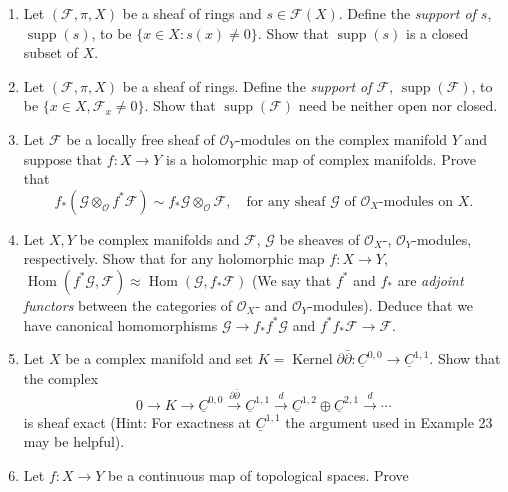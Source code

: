 \begin{enumerate}
\begin{enumerate}[label=\Alph*)]
\item $\widetilde{\mathcal F}_x=0$, $x\notin Z$, $=\mathcal F_x$, $x\in Z$.
\item $i^{-1}\widetilde{\mathcal F}\approx\mathcal F$.
\end{enumerate}
\item Let $(\mathcal F,\pi,X)$ be a sheaf of rings and $s\in\mathcal F(X)$. Define the \emph{support of $s$}, $\operatorname{supp}(s)$, to be $\{x\in X:s(x)\neq0\}$. Show that $\operatorname{supp}(s)$ is a closed subset of $X$.
\item Let $(\mathcal F,\pi,X)$ be a sheaf of rings. Define the \emph{support of $\mathcal F$}, $\operatorname{supp}(\mathcal F)$, to be $\{x\in X,\mathcal F_x\neq0\}$. Show that $\operatorname{supp}(\mathcal F)$ need be neither open nor closed.
\item Let $\mathcal F$ be a locally free sheaf of $\mathcal O_Y$-modules on the complex manifold $Y$ and suppose that $f:X\to Y$ is a holomorphic map of complex manifolds. Prove that
\[
f_*(\mathcal G\otimes_{\mathcal O}f^*\mathcal F)\sim f_*\mathcal G\otimes_{\mathcal O}\mathcal F,\quad\text{for any sheaf $\mathcal G$ of $\mathcal O_X$-modules on $X$.}
\]
\item Let $X,Y$ be complex manifolds and $\mathcal F$, $\mathcal G$ be sheaves of $\mathcal O_X$-, $\mathcal O_Y$-modules, respectively. Show that for any holomorphic map $f:X\to Y$, $\operatorname{Hom}(f^*\mathcal G,\mathcal F)\approx\operatorname{Hom}(\mathcal G,f_*\mathcal F)$ (We say that $f^*$ and $f_*$ are \emph{adjoint functors} between the categories of $\mathcal O_X$- and $\mathcal O_Y$-modules). Deduce that we have canonical homomorphisms $\mathcal G\to f_*f^*\mathcal G$ and $f^*f_*\mathcal F\to\mathcal F$.
\item Let $X$ be a complex manifold and set $K=\operatorname{Kernel}\partial\bar\partial:\underline C^{0,0}\to\underline C^{1,1}$. Show that the complex
\[
0\to K\to\underline C^{0,0}\xrightarrow{\partial\bar\partial}\underline C^{1,1}\xrightarrow d\underline C^{1,2}\oplus\underline C^{2,1}\xrightarrow d\cdots
\]
is sheaf exact (Hint: For exactness at $\underline C^{1,1}$ the argument used in Example 23 may be helpful).
\item Let $f:X\to Y$ be a continuous map of topological spaces. Prove
\begin{enumerate}[label=\alph*)]

\end{enumerate}
\end{enumerate}
